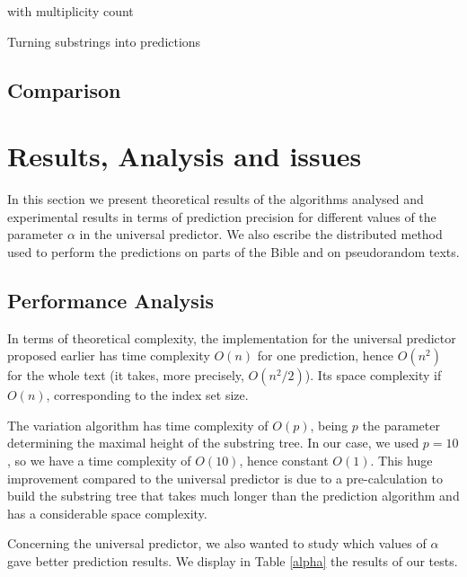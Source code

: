 \documentclass[a4paper,12pt]{article}
\begin{document}
  \begin{algorithm}



     with multiplicity count\;

    \caption{\label{predicting}Turning substrings into predictions}
  \end{algorithm}

  \subsection{Comparison}



  \section{Results, Analysis and issues}\label{tests}

  In this section we present theoretical results of the algorithms analysed and experimental results in terms of prediction precision for different values of the parameter $\alpha$ in the universal predictor. We also escribe the distributed method used to perform the predictions on parts of the Bible and on pseudorandom texts.

  \subsection{Performance Analysis}

  In terms of theoretical complexity, the implementation for the universal predictor proposed earlier has time complexity $O(n)$ for one prediction, hence $O(n^2)$ for the whole text (it takes, more precisely, $O(n^2/2)$). Its space complexity if $O(n)$, corresponding to the index set size.

  The variation algorithm has time complexity of $O(p)$, being $p$ the parameter determining the maximal height of the substring tree. In our case, we used $p=10$, so we have a time complexity of $O(10)$, hence constant $O(1)$. This huge improvement compared to the universal predictor is due to a pre-calculation to build the substring tree that takes much longer than the prediction algorithm and has a considerable space complexity.

  Concerning the universal predictor, we also wanted to study which values of $\alpha$ gave better prediction results. We display in Table \ref{alpha} the results of our tests.
\end{document}
